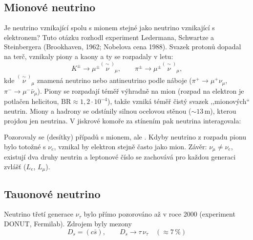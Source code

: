 \subsection{Mionové neutrino}

Je neutrino vznikající spolu s mionem stejné jako neutrino vznikající s elektronem? Tuto otázku
rozhodl experiment Ledermana, Schwartze a Steinbergera (Brookhaven, 1962; Nobelova cena 1988).
Svazek protonů dopadal na terč, vznikaly piony a kaony a ty se rozpadaly v letu:
\[
  K^\pm \to \mu^\pm \overset{(\sim)}{\nu}_\mu,\qquad
  \pi^\pm \to \mu^\pm \overset{(\sim)}{\nu}_\mu ,
\]
kde \(\overset{(\sim)}{\nu}_\mu\) znamená neutrino nebo antineutrino podle náboje (\(\pi^+\to\mu^+\nu_\mu\),
\(\pi^-\to\mu^-\bar\nu_\mu\)). Piony se rozpadají téměř výhradně na mion (rozpad na elektron
je potlačen helicitou, \(\mathrm{BR}\approx1{,}2\cdot10^{-4}\)), takže vzniká téměř čistý svazek
,,mionových`` neutrin. Miony a hadrony se odstínily silnou ocelovou stěnou (\(\sim
13\,\mathrm{m}\)), kterou projdou jen neutrina. V jiskrové komoře za stínením pak
neutrina interagovala:

\begin{center}
\end{center}

Pozorovaly se (desítky) případů s mionem, ale . Kdyby
neutrino z rozpadu pionu bylo totožné s \(\nu_e\), vznikal by elektron stejně často jako
mion. Závěr: \(\nu_\mu\neq\nu_e\), existují dva druhy neutrin a leptonové číslo se zachovává
pro každou generaci zvlášť (\(L_e\), \(L_\mu\)).

\subsection{Tauonové neutrino}

Neutrino třetí generace \(\nu_\tau\) bylo přímo pozorováno až v roce 2000 (experiment DONUT,
Fermilab). Zdrojem byly mezony
\[
  D_s = (c\bar s),\qquad D_s\to\tau\,\nu_\tau \quad (\approx 7\,\%)
\]

